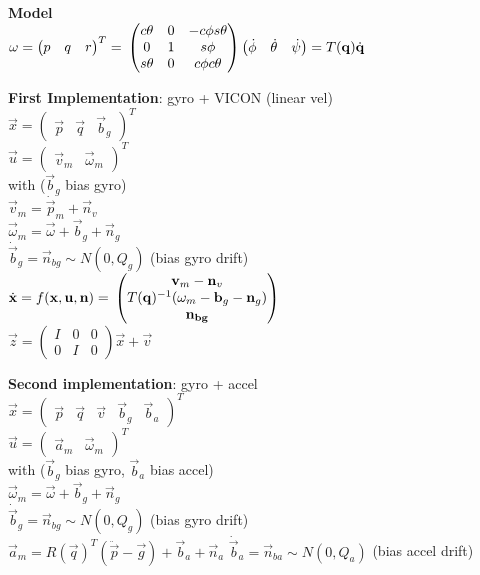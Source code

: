\textbf{Model}\\
$\vec{\omega} = \begin{pmatrix} p & q & r\end{pmatrix}^T = \\
\begin{pmatrix}
  c \theta & 0 & -c \phi s \theta \\
  0 & 1 & s \phi \\
  s \theta & 0 & c \phi c \theta
\end{pmatrix}
\begin{pmatrix}
  \dot{\phi} & \dot{\theta} & \dot{\psi}
\end{pmatrix} = T(\vec{q}) \dot{\vec{q}}
$

\textbf{First Implementation}: gyro + VICON (linear vel)\\
$\vec{x} = \begin{pmatrix}\vec{p}   & \vec{q} & \vec{b}_g\end{pmatrix}^T$\\
$\vec{u} = \begin{pmatrix}\vec{v}_m & \vec{\omega}_m\end{pmatrix}^T$\\
with ($\vec{b}_g$ bias gyro)\\
$\vec{v}_m = \dot{\vec{p}}_m + \vec{n}_v$\\
$\vec{\omega}_m = \vec{\omega} + \vec{b}_g + \vec{n}_g$\\
$\dot{\vec{b}}_g = \vec{n}_{bg} \sim N(0, Q_g)$ (bias gyro drift)\\

$\dot{\vec{x}} = f(\vec{x}, \vec{u}, \vec{n}) = \\
 \begin{pmatrix}
   \vec{v}_m - \vec{n}_v\\
   T(\vec{q})^{-1} ( \vec{\omega}_m - \vec{b}_g - \vec{n}_g) \\
   \vec{n_{bg}}
 \end{pmatrix}
$\\

$\vec{z} = \begin{pmatrix} I & 0 & 0\\0 & I & 0\end{pmatrix} \vec{x} +
\vec{v}$

\textbf{Second implementation}: gyro + accel\\
$\vec{x} = \begin{pmatrix}\vec{p}   & \vec{q} & \vec{v} &
\vec{b}_g & \vec{b}_a \end{pmatrix}^T$\\
$\vec{u} = \begin{pmatrix}\vec{a}_m & \vec{\omega}_m\end{pmatrix}^T$\\
with ($\vec{b}_g$ bias gyro, $\vec{b}_a$ bias accel)\\
$\vec{\omega}_m = \vec{\omega} + \vec{b}_g + \vec{n}_g$\\
$\dot{\vec{b}}_g = \vec{n}_{bg} \sim N(0, Q_g)$ (bias gyro drift)\\
$\vec{a}_m = R(\vec{q})^T (\ddot{\vec{p}} - \vec{g}) + \vec{b}_a +
\vec{n}_a$
$\dot{\vec{b}}_a = \vec{n}_{ba} \sim N(0, Q_a)$ (bias accel drift)\\


